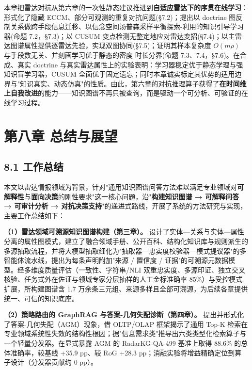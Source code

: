 \documentclass[12pt,a4paper]{ctexart}
\begin{document}
本章把雷达对抗从第六章的一次性静态建议推进到\textbf{自适应雷达下的序贯在线学习}：形式化了隐藏 ECCM、部分可观测的重复对抗问题(§7.2)；提出以 doctrine 图反制关系做跨手段信息迁移、以信念空间汤普森采样平衡探索-利用的知识引导学习器(命题 7.2，§7.3)；以 CUSUM 变点检测无整定地应对雷达变招(§7.4)；以主雷达图谱属性提供逐雷达先验，实现双图协同(§7.5)；证明其样本复杂度 $O(m\rho)$ 与手段数无关、并刻画学习优于静态的密度-时长分界(命题 7.3、7.4，§7.6)。在合成、真实 doctrine 与真实雷达属性上的实验表明：学习器稳定优于静态学理与强知识盲学习器，CUSUM 全面优于固定遗忘；同时本章诚实标定其优势的适用边界与"知识真实、动态仿真"的性质。由此，第六章的对抗推理算子获得了\textbf{在时间维上自我改进}的能力——知识图谱不再只被查询，而是驱动一个可分析、可验证的在线学习过程。


\section*{第八章 总结与展望}

\subsection*{8.1 工作总结}

本文以雷达情报领域为背景，针对"通用知识图谱问答方法难以满足专业领域对\textbf{可解释性}与\textbf{面向决策}的刚性要求"这一核心问题，沿"\textbf{构建知识图谱 → 可解释问答 → 可审计分析 → 对抗决策支持}"的递进式路线，开展了系统的方法研究与实现，主要工作总结如下：

\textbf{（1）雷达领域可溯源知识图谱构建（第三章）。} 设计了实体—关系与实体—属性分离的属性图模式，建立了融合领域手册、公开百科、结构化知识库与规则派生的多源抽取流程，并将大模型抽取细化为"抽取器—忠实度校验器—模式提议器"的多智能体流水线，提出为每条声明附加"来源 / 置信度 / 证据"的可溯源元数据模型。经多维度质量评估（一致性、字符串/NLI 双重忠实度、多源印证、独立交叉核验、任务式外在佐证与领域专家分层抽样的人工金标准确率 85\%）与受控模式扩展，所构建图谱含 1.7 万余条三元组、来源多样且全部可溯源，为后续各章提供统一、可信的知识底座。

\textbf{（2）策略路由的 GraphRAG 与答案-几何失配诊断（第四章）。} 提出并形式化了答案-几何失配（AGM）现象，借 OLTP/OLAP 框架揭示了通用 Top-K 检索在专业领域系统性失效的结构性根因；据"信息需求类"推导出六类类型化检索算子与一个轻量分发器。在显式暴露 AGM 的 RadarKG-QA-499 基准上取得 88.6\% 的总体准确率，较基线 +35.9 pp、较 RoG +28.3 pp；消融实验将增益精确定位到算子设计（分发器贡献约 0 pp）。
\end{document}
